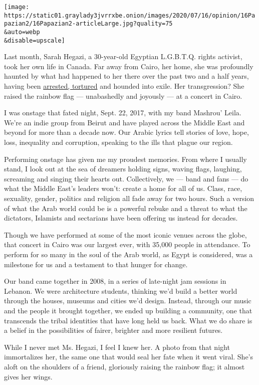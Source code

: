 \texttt{[image: https://static01.graylady3jvrrxbe.onion/images/2020/07/16/opinion/16Papazian2/16Papazian2-articleLarge.jpg?quality=75\\\&auto=webp\\\&disable=upscale]}

Last month, Sarah Hegazi, a 30-year-old Egyptian L.G.B.T.Q. rights
activist, took her own life in Canada. Far away from Cairo, her home,
she was profoundly haunted by what had happened to her there over the
past two and a half years, having been
\href{https://www.nytimes3xbfgragh.onion/2020/06/15/world/middleeast/egypt-gay-suicide-sarah-hegazi.html}{arrested,
tortured} and hounded into exile. Her transgression? She raised the
rainbow flag --- unabashedly and joyously --- at a concert in Cairo.

I was onstage that fated night, Sept. 22, 2017, with my band Mashrou'
Leila. We're an indie group from Beirut and have played across the
Middle East and beyond for more than a decade now. Our Arabic lyrics
tell stories of love, hope, loss, inequality and corruption, speaking to
the ills that plague our region.

Performing onstage has given me my proudest memories. From where I
usually stand, I look out at the sea of dreamers holding signs, waving
flags, laughing, screaming and singing their hearts out. Collectively,
we --- band and fans --- do what the Middle East's leaders won't: create
a home for all of us. Class, race, sexuality, gender, politics and
religion all fade away for two hours. Such a version of what the Arab
world could be is a powerful rebuke and a threat to what the dictators,
Islamists and sectarians have been offering us instead for decades.

Though we have performed at some of the most iconic venues across the
globe, that concert in Cairo was our largest ever, with 35,000 people in
attendance. To perform for so many in the soul of the Arab world, as
Egypt is considered, was a milestone for us and a testament to that
hunger for change.

Our band came together in 2008, in a series of late-night jam sessions
in Lebanon. We were architecture students, thinking we'd build a better
world through the houses, museums and cities we'd design. Instead,
through our music and the people it brought together, we ended up
building a community, one that transcends the tribal identities that
have long held us back. What we do share is a belief in the
possibilities of fairer, brighter and more resilient futures.

While I never met Ms. Hegazi, I feel I knew her. A photo from that night
immortalizes her, the same one that would seal her fate when it went
viral. She's aloft on the shoulders of a friend, gloriously raising the
rainbow flag; it almost gives her wings.

